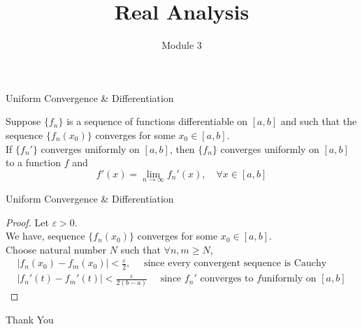 \documentclass{beamer}
\title{Real Analysis}
\author{Module 3}
\institute{Section 7.17 \\ Uniform Convergence \& Differentiation}
\begin{document}
\begin{frame}
\maketitle
\end{frame}

\begin{frame}{Uniform Convergence \& Differentiation}
\begin{theorem}[7.17]
	Suppose $\{f_n\}$ is a sequence of functions differentiable on $[a,b]$ and such that the sequence $\{f_n(x_0)\}$ converges for some $x_0 \in [a,b]$.\\
	If $\{f_n'\}$ converges uniformly on $[a,b]$, then $\{f_n\}$ converges uniformly on $[a,b]$ to a function $f$ and
	\[ f'(x) = \lim_{n \to \infty} f_n'(x),\quad \forall x \in [a,b] \]
\end{theorem}
\end{frame}

\begin{frame}{Uniform Convergence \& Differentiation}
	\begin{proof}
		Let $\varepsilon > 0$.\\
		We have, sequence $\{f_n(x_0)\}$  converges for some $x_0 \in [a,b]$.\\
		Choose natural number $N$ such that $\forall n,m \ge N$, 
	\begin{align*}
		\left| f_n(x_0) - f_m(x_0) \right| < \frac{\varepsilon}{2},\quad \text{ since every convergent sequence is Cauchy} \\
	 	\left| f_n'(t) - f_m'(t) \right| < \frac{\varepsilon}{2(b-a)}\quad \text{ since } f_n' \text{ converges to } f \text{uniformly on } [a,b] 
	\end{align*}
	\end{proof}
\end{frame}

\begin{frame}
	\vspace{0.6in}
	\hspace{3cm} {\color{blue}\Huge{Thank You}}
\end{frame}
\end{document}
